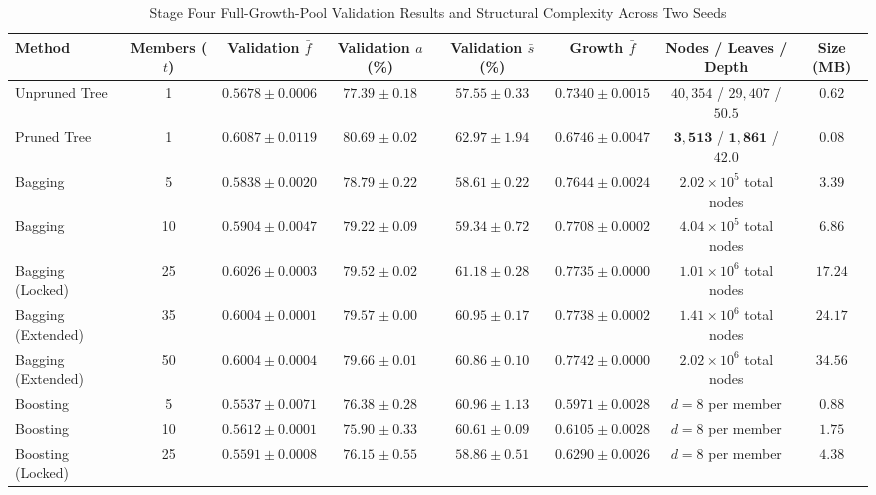 \begin{table}[!t]
\centering
\caption{Stage Four Full-Growth-Pool Validation Results and Structural Complexity Across Two Seeds}
\label{tab:final_validation}
\footnotesize
\setlength{\tabcolsep}{2.6pt}
\begin{tabular}{lccccccc}
\toprule
\textbf{Method} & \textbf{Members ($t$)} & \textbf{Validation $\bar{f}$} & \textbf{Validation $a$ (\%)} & \textbf{Validation $\bar{s}$ (\%)} & \textbf{Growth $\bar{f}$} & \textbf{Nodes / Leaves / Depth} & \textbf{Size (MB)} \\
\midrule
Unpruned Tree      &  1 & $0.5678 \pm 0.0006$ & $77.39 \pm 0.18$ & $57.55 \pm 0.33$ & $0.7340 \pm 0.0015$ & $40{,}354$ / $29{,}407$ / $50.5$ &  $0.62$ \\
Pruned Tree        &  1 & $\mathbf{0.6087 \pm 0.0119}$ & $\mathbf{80.69 \pm 0.02}$ & $\mathbf{62.97 \pm 1.94}$ & $0.6746 \pm 0.0047$ & $\mathbf{3{,}513}$ / $\mathbf{1{,}861}$ / $42.0$ & $\mathbf{0.08}$ \\
\midrule
Bagging            &  5 & $0.5838 \pm 0.0020$ & $78.79 \pm 0.22$ & $58.61 \pm 0.22$ & $0.7644 \pm 0.0024$ & $2.02 \times 10^5$ total nodes &  $3.39$ \\
Bagging            & 10 & $0.5904 \pm 0.0047$ & $79.22 \pm 0.09$ & $59.34 \pm 0.72$ & $0.7708 \pm 0.0002$ & $4.04 \times 10^5$ total nodes &  $6.86$ \\
Bagging (Locked)   & 25 & $0.6026 \pm 0.0003$ & $79.52 \pm 0.02$ & $61.18 \pm 0.28$ & $\mathbf{0.7735 \pm 0.0000}$ & $1.01 \times 10^6$ total nodes & $17.24$ \\
Bagging (Extended) & 35 & $0.6004 \pm 0.0001$ & $79.57 \pm 0.00$ & $60.95 \pm 0.17$ & $0.7738 \pm 0.0002$ & $1.41 \times 10^6$ total nodes & $24.17$ \\
Bagging (Extended) & 50 & $0.6004 \pm 0.0004$ & $79.66 \pm 0.01$ & $60.86 \pm 0.10$ & $0.7742 \pm 0.0000$ & $2.02 \times 10^6$ total nodes & $34.56$ \\
\midrule
Boosting           &  5 & $0.5537 \pm 0.0071$ & $76.38 \pm 0.28$ & $60.96 \pm 1.13$ & $0.5971 \pm 0.0028$ & $d = 8$ per member &  $0.88$ \\
Boosting           & 10 & $0.5612 \pm 0.0001$ & $75.90 \pm 0.33$ & $60.61 \pm 0.09$ & $0.6105 \pm 0.0028$ & $d = 8$ per member &  $1.75$ \\
Boosting (Locked)  & 25 & $0.5591 \pm 0.0008$ & $76.15 \pm 0.55$ & $58.86 \pm 0.51$ & $0.6290 \pm 0.0026$ & $d = 8$ per member &  $4.38$ \\
\bottomrule
\end{tabular}
\end{table}

